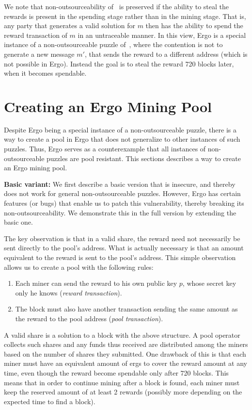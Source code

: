 \documentclass[11pt]{article}
\begin{document}
We note that non-outsourceability of~\cite{miller2015nonoutsourceable} is preserved if the ability to steal the rewards is present in the spending stage rather than in the mining stage. That is, any party that generates a valid solution for $m$ then has the ability to spend the reward transaction of $m$ in an untraceable manner. 
In this view, Ergo is a special instance of a non-outsourceable puzzle of~\cite{miller2015nonoutsourceable}, where the contention is not to generate a new message $m'$, that sends the reward to a different address (which is not possible in Ergo). Instead the goal is to steal the reward 720 blocks later, when it becomes spendable. 

\section{Creating an Ergo Mining Pool}

Despite Ergo being a special instance of a non-outsourceable puzzle, there is a way to create a pool in Ergo that does not generalize to other instances of such puzzles. Thus, Ergo serves as a counterexample  
that all instances of non-outsourceable puzzles are pool resistant. This sections describes a way to create an Ergo mining pool. 

\textbf{Basic variant:} We first describe a basic version that is insecure, and thereby does not work for general non-outsourceable puzzles. However, Ergo has certain features (or bugs) that enable us to patch this vulnerability, thereby breaking its non-outsourceability. We demonstrate this in the full version by extending the basic one. 

The key observation is that in a valid share, the reward need not necessarily be sent directly to the pool's address. What is actually necessary is that an amount equivalent to the reward is sent to the pool's address. This simple observation allows us to create a pool with the following rules:
\begin{enumerate}
	\item Each miner can send the reward to his own public key $p$, whose secret key only he knows ({\em reward transaction}).
	\item The block must also have another transaction sending the same amount as the reward to the pool address ({\em pool transaction}).
\end{enumerate}

A valid share is a solution to a block with the above structure. A pool operator collects such shares and any funds thus received are distributed among the miners based on the number of shares they submitted. One drawback of this is that each miner must have an equivalent amount of ergs to cover the reward amount at any time, even though the reward become spendable only after 720 blocks. 
This means that in order to continue mining after a block is found, each miner must keep the reserved amount of at least 2 rewards (possibly more depending on the expected time to find a block).
\end{document}
